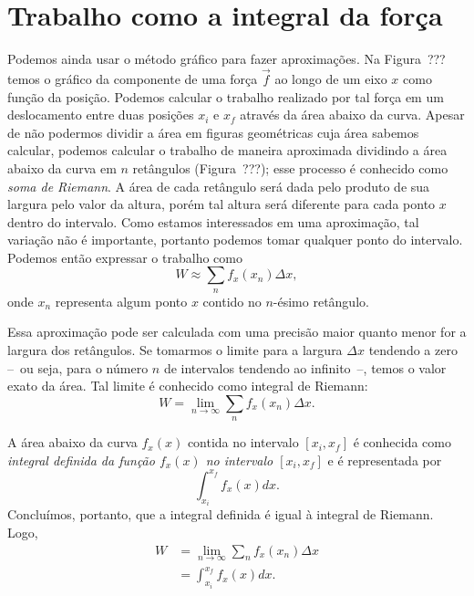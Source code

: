 \section{Trabalho como a integral da força}

Podemos ainda usar o método gráfico para fazer aproximações. Na Figura~??? temos o gráfico da componente de uma força $\vec{f}$ ao longo de um eixo $x$ como função da posição. 
Podemos calcular o trabalho realizado por tal força em um deslocamento entre duas posições $x_i$ e $x_f$ através da área abaixo da curva. Apesar de não podermos dividir a área em figuras geométricas cuja área sabemos calcular, podemos calcular o trabalho de maneira aproximada dividindo a área abaixo da curva em $n$ retângulos (Figura~???); esse processo é conhecido como \emph{soma de Riemann}. A área de cada retângulo será dada pelo produto de sua largura pelo valor da altura, porém tal altura será diferente para cada ponto $x$ dentro do intervalo. Como estamos interessados em uma aproximação, tal variação não é importante, portanto podemos tomar qualquer ponto do intervalo. Podemos então expressar o trabalho como
\begin{equation}
  W \approx \sum_n f_x(x_n)\Delta x,
\end{equation}
%
onde $x_n$ representa algum ponto $x$ contido no $n$-ésimo retângulo.

Essa aproximação pode ser calculada com uma precisão maior quanto menor for a largura dos retângulos. Se tomarmos o limite para a largura $\Delta x$ tendendo a zero --~ou seja, para o número $n$ de intervalos tendendo ao infinito~--, temos o valor exato da área. Tal limite é conhecido como integral de Riemann:
\begin{equation}
  W = \lim_{n \to \infty} \sum_{n} f_x(x_n) \Delta x.
\end{equation}

A área abaixo da curva $f_x(x)$ contida no intervalo $[x_i,x_f]$ é conhecida como \emph{integral definida da função $f_x(x)$ no intervalo $[x_i,x_f]$} e é representada por
\begin{equation}
  \int_{x_i}^{x_f} f_x(x) dx.
\end{equation}
Concluímos, portanto, que a integral definida é igual à integral de Riemann. Logo,
\begin{align}
  W &= \lim_{n \to \infty} \sum_{n} f_x(x_n) \Delta x \\
  &= \int_{x_i}^{x_f} f_x(x) dx. \label{Eq:TrabalhoIntegral}
\end{align}

